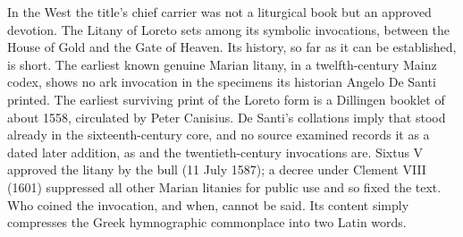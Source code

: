In the West the title's chief carrier was not a liturgical book but an
approved devotion. The Litany of Loreto sets  among its
symbolic invocations, between the House of Gold and the Gate of Heaven. Its
history, so far as it can be established, is short. The earliest known
genuine Marian litany, in a twelfth-century Mainz codex, shows no ark
invocation in the specimens its historian Angelo De Santi printed. The
earliest surviving print of the Loreto form is a Dillingen booklet of about
1558, circulated by Peter Canisius. De Santi's collations imply that
 stood already in the sixteenth-century core, and no
source examined records it as a dated later addition, as  and the twentieth-century invocations are. Sixtus V approved
the litany by the bull  (11 July 1587); a decree under
Clement VIII (1601) suppressed all other Marian litanies for public use and
so fixed the text. Who coined the invocation, and when, cannot be said. Its
content simply compresses the Greek hymnographic commonplace into two Latin
words.

